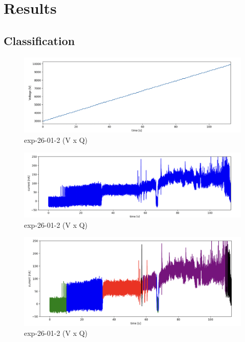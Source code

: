 \chapter{Results}
\label{chap:Results}

\section{Classification}
\label{sec:classification_results}


\begin{figure}[H]
    \center
    \includegraphics[width=12cm]{Figuras/19:03/voltage_step.png}
    \caption{ exp-26-01-2 (V x Q)}
\end{figure}


\begin{figure}[H]
    \center
    \includegraphics[width=12cm]{Figuras/19:03/raw-data-example.png}
    \caption{ exp-26-01-2 (V x Q)}
\end{figure}


\begin{figure}[H]
    \center
    \includegraphics[width=12cm]{Figuras/19:03/classified-data-example.png}
    \caption{ exp-26-01-2 (V x Q)}
\end{figure}


